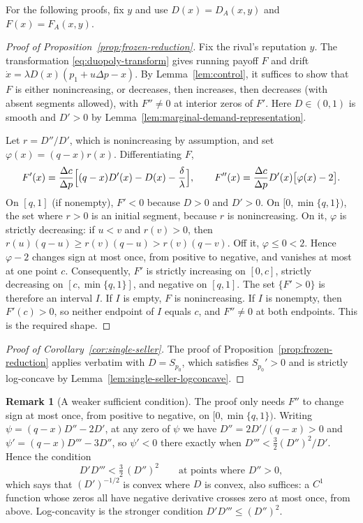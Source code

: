 \documentclass[11pt]{article}
\theoremstyle{definition}
\newtheorem{remark}{Remark}
\begin{document}
For the following proofs, fix $y$ and use $D(x)=D_A(x,y)$ and
$F(x)=F_A(x,y)$.

\begin{proof}[Proof of Proposition~\ref{prop:frozen-reduction}]
Fix the rival's reputation $y$. The transformation
\eqref{eq:duopoly-transform} gives running payoff $F$ and drift
$\dot x=\lambda D(x)(p_1+u\Delta p-x)$. By
Lemma~\ref{lem:control}, it suffices to show that $F$ is either
nonincreasing, or decreases, then increases, then decreases (with absent
segments allowed), with $F''\neq0$ at interior zeros of $F'$. Here
$D\in(0,1)$ is smooth and $D'>0$ by
Lemma~\ref{lem:marginal-demand-representation}.

Let $r=D''/D'$, which is nonincreasing by assumption, and set
$\varphi(x)=(q-x)r(x)$. Differentiating $F$,
\begin{equation*}
F'(x)=\frac{\Delta c}{\Delta p}\Bigl[(q-x)D'(x)-D(x)-\frac\delta\lambda\Bigr],
\qquad
F''(x)=\frac{\Delta c}{\Delta p}D'(x)\bigl[\varphi(x)-2\bigr].
\end{equation*}
On $[q,1]$ (if nonempty), $F'<0$ because $D>0$ and $D'>0$. On
$[0,\min\{q,1\})$, the set where $r>0$ is an initial segment, because $r$ is
nonincreasing. On it, $\varphi$ is strictly decreasing: if $u<v$ and
$r(v)>0$, then $r(u)(q-u)\geq r(v)(q-u)>r(v)(q-v)$. Off it,
$\varphi\leq0<2$. Hence $\varphi-2$ changes sign at most once, from positive
to negative, and vanishes at most at one point $c$. Consequently, $F'$ is
strictly increasing on $[0,c]$, strictly decreasing on $[c,\min\{q,1\}]$,
and negative on $[q,1]$. The set $\{F'>0\}$ is therefore an interval $I$. If
$I$ is empty, $F$ is nonincreasing. If $I$ is nonempty, then $F'(c)>0$, so
neither endpoint of $I$ equals $c$, and $F''\neq0$ at both endpoints. This
is the required shape.
\end{proof}

\begin{proof}[Proof of Corollary~\ref{cor:single-seller}]
The proof of Proposition~\ref{prop:frozen-reduction} applies verbatim with
$D=S_{p_0}$, which satisfies $S_{p_0}'>0$ and is strictly log-concave by
Lemma~\ref{lem:single-seller-logconcave}.
\end{proof}

\begin{remark}[A weaker sufficient condition]
The proof only needs $F''$ to change sign at most once, from positive to
negative, on $[0,\min\{q,1\})$. Writing $\psi=(q-x)D''-2D'$, at any zero of
$\psi$ we have $D''=2D'/(q-x)>0$ and $\psi'=(q-x)D'''-3D''$, so $\psi'<0$
there exactly when $D'''<\tfrac32(D'')^2/D'$. Hence the condition
\begin{equation*}
D'D'''<\tfrac32\,(D'')^2\qquad\text{at points where }D''>0,
\end{equation*}
which says that $(D')^{-1/2}$ is convex where $D$ is convex, also suffices:
a $C^1$ function whose zeros all have negative derivative crosses zero at
most once, from above. Log-concavity is the stronger condition
$D'D'''\leq(D'')^2$.
\end{remark}
\end{document}

